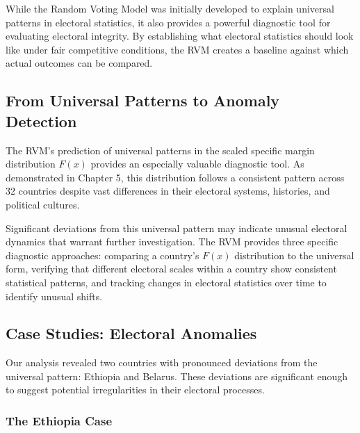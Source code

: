 While the Random Voting Model was initially developed to explain universal patterns in electoral statistics, it also provides a powerful diagnostic tool for evaluating electoral integrity. By establishing what electoral statistics should look like under fair competitive conditions, the RVM creates a baseline against which actual outcomes can be compared.

\subsection{From Universal Patterns to Anomaly Detection}

The RVM's prediction of universal patterns in the scaled specific margin distribution $F(x)$ provides an especially valuable diagnostic tool. As demonstrated in Chapter 5, this distribution follows a consistent pattern across 32 countries despite vast differences in their electoral systems, histories, and political cultures.

Significant deviations from this universal pattern may indicate unusual electoral dynamics that warrant further investigation. The RVM provides three specific diagnostic approaches: comparing a country's $F(x)$ distribution to the universal form, verifying that different electoral scales within a country show consistent statistical patterns, and tracking changes in electoral statistics over time to identify unusual shifts.


\subsection{Case Studies: Electoral Anomalies}

Our analysis revealed two countries with pronounced deviations from the universal pattern: Ethiopia and Belarus. These deviations are significant enough to suggest potential irregularities in their electoral processes.

\subsubsection{The Ethiopia Case}

